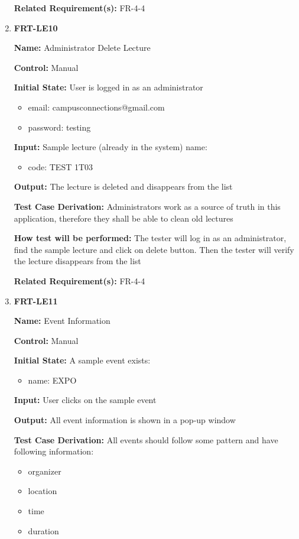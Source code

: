 \documentclass[12pt, titlepage]{article}
\begin{document}
\begin{enumerate}
\textbf{Related Requirement(s):} FR-4-4

\item{\textbf{FRT-LE10}}

\textbf{Name:} Administrator Delete Lecture

\textbf{Control:} Manual
					
\textbf{Initial State:} User is logged in as an administrator
\begin{itemize}
\item email: campusconnections@gmail.com
\item password: testing
\end{itemize}

\textbf{Input:} Sample lecture (already in the system) name:
\begin{itemize}
\item code: TEST 1T03
\end{itemize}
					
\textbf{Output:} The lecture is deleted and disappears from the list

\textbf{Test Case Derivation:} Administrators work as a source of truth in this application, therefore they shall be able to clean old lectures
					
\textbf{How test will be performed:} The tester will log in as an administrator, find the sample lecture and click on delete button. Then the tester will verify the lecture disappears from the list

\textbf{Related Requirement(s):} FR-4-4

\item{\textbf{FRT-LE11}}

\textbf{Name:} Event Information

\textbf{Control:} Manual
					
\textbf{Initial State:} A sample event exists:
\begin{itemize}
\item name: EXPO
\end{itemize}

\textbf{Input:} User clicks on the sample event
					
\textbf{Output:} All event information is shown in a pop-up window

\textbf{Test Case Derivation:} All events should follow some pattern and have following information:
\begin{itemize}
\item organizer
\item location
\item time
\item duration
\end{itemize}
					

\end{enumerate}
\end{document}
